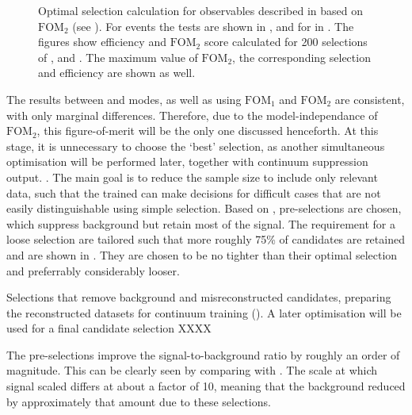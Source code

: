 \begin{figure}[htbp!]
{        }
    \caption{\label{fig:selection_optimisations} Optimal selection calculation for observables
    described in  based on $\mathrm{FOM}_2$ (see ).
    For \BptoXsgamma events the tests are shown
    in ,
    and for \BztoXsgamma in .
    The figures show efficiency and $\mathrm{FOM}_2$ score calculated for 200 selections of \piVeto, \etaVeto and \ZMVA.
    The maximum value of $\mathrm{FOM}_2$, the corresponding selection and efficiency are shown as well.
    }
\end{figure}

The results between \Bp and \Bz modes, as well as using $\mathrm{FOM}_1$ and $\mathrm{FOM}_2$ are consistent, with only marginal differences.
Therefore, due to the model-independance of $\mathrm{FOM}_2$, this figure-of-merit will be the only one discussed henceforth.
At this stage, it is unnecessary to choose the `best' selection, as another simultaneous optimisation will be performed later, together with continuum suppression \BDT output.
. 
The main goal is to reduce the sample size to include only relevant data, such that the trained \BDT can make decisions for difficult cases that are not easily distinguishable using simple selection.
Based on , pre-selections are chosen, which suppress background but retain most of the signal.
The requirement for a loose selection are tailored such that more roughly 75\% of \BtoXsgamma candidates are retained and are shown in .
They are chosen to be no tighter than their optimal selection and preferrably considerably looser.

\begin{table}[htbp!]
    \centering
    \caption{\label{tab:preselections} Selections that remove background and misreconstructed candidates,
    preparing the reconstructed datasets  for continuum \BDT training ().
    A later optimisation will be used for a final candidate selection XXXX
    }
    
\end{table}

The pre-selections improve the signal-to-background ratio by roughly an order of magnitude.
This can be clearly seen by comparing  with .
The scale at which \BtoXsgamma signal \MC scaled differs at about a factor of 10, meaning that the background reduced by approximately that amount due to these selections.


